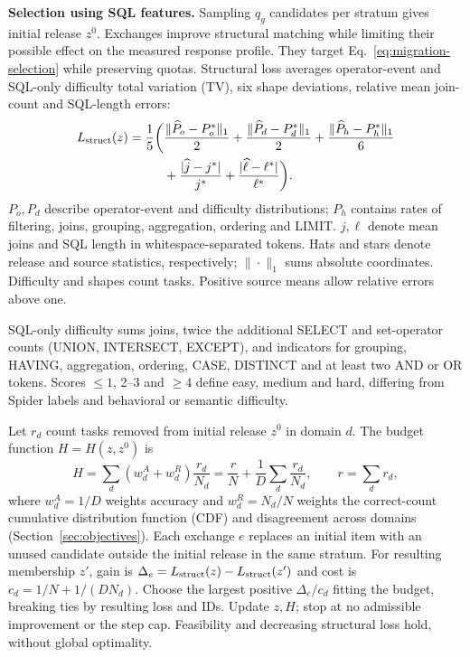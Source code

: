 \textbf{Selection using SQL features.} Sampling $q_g$ candidates per stratum gives initial release $z^0$. Exchanges improve structural matching while limiting their possible effect on the measured response profile. They target Eq.~\eqref{eq:migration-selection} while preserving quotas. Structural loss averages operator-event and SQL-only difficulty total variation (TV), six shape deviations, relative mean join-count and SQL-length errors:
\begin{align}
 L_{\rm struct}(z)=\frac15\bigg(&\frac{\|\widehat P_o-P_o^*\|_1}{2}
 +\frac{\|\widehat P_d-P_d^*\|_1}{2}
 +\frac{\|\widehat P_h-P_h^*\|_1}{6}\nonumber\\
 &+\frac{|\widehat j-j^*|}{j^*}
 +\frac{|\widehat\ell-\ell^*|}{\ell^*}\bigg).
 \label{eq:struct-expanded}
\end{align}
$P_o,P_d$ describe operator-event and difficulty distributions; $P_h$ contains rates of filtering, joins, grouping, aggregation, ordering and LIMIT. $j,\ell$ denote mean joins and SQL length in whitespace-separated tokens. Hats and stars denote release and source statistics, respectively; $\|\cdot\|_1$ sums absolute coordinates. Difficulty and shapes count tasks. Positive source means allow relative errors above one.

SQL-only difficulty sums joins, twice the additional SELECT and set-operator counts (UNION, INTERSECT, EXCEPT), and indicators for grouping, HAVING, aggregation, ordering, CASE, DISTINCT and at least two AND or OR tokens. Scores $\le1$, 2--3 and $\ge4$ define easy, medium and hard, differing from Spider labels and behavioral or semantic difficulty.

Let $r_d$ count tasks removed from initial release $z^0$ in domain $d$. The budget function $H=H(z,z^0)$ is
\begin{equation}
 H=\sum_d(w_d^A+w_d^R)\frac{r_d}{N_d}
 =\frac rN+\frac1D\sum_d\frac{r_d}{N_d},\qquad r=\sum_dr_d,
 \label{eq:budget}
\end{equation}
where $w_d^A=1/D$ weights accuracy and $w_d^R=N_d/N$ weights the correct-count cumulative distribution function (CDF) and disagreement across domains (Section~\ref{sec:objectives}). Each exchange $e$ replaces an initial item with an unused candidate outside the initial release in the same stratum. For resulting membership $z'$, gain is $\Delta_e=L_{\rm struct}(z)-L_{\rm struct}(z')$ and cost is $c_d=1/N+1/(DN_d)$. Choose the largest positive $\Delta_e/c_d$ fitting the budget, breaking ties by resulting loss and IDs. Update $z,H$; stop at no admissible improvement or the step cap. Feasibility and decreasing structural loss hold, without global optimality.

